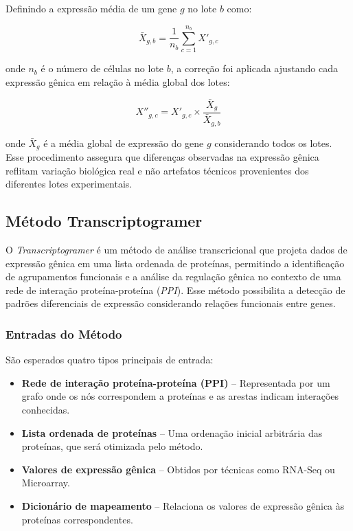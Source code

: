 \documentclass[12pt]{article}
\begin{document}
Definindo a expressão média de um gene $g$ no lote $b$ como:

\begin{equation}
    \bar{X}_{g,b} = \frac{1}{n_b} \sum_{c=1}^{n_b} X'_{g,c}
\end{equation}

onde $n_b$ é o número de células no lote $b$, a correção foi aplicada ajustando cada expressão gênica em relação à média global dos lotes:

\begin{equation}
    X''_{g,c} = X'_{g,c} \times \frac{\bar{X}_g}{\bar{X}_{g,b}}
\end{equation}

onde $\bar{X}_g$ é a média global de expressão do gene $g$ considerando todos os lotes. Esse procedimento assegura que diferenças observadas na expressão gênica reflitam variação biológica real e não artefatos técnicos provenientes dos diferentes lotes experimentais.



\subsection{Método Transcriptogramer\cite{morais}}

O \textit{Transcriptogramer} é um método de análise transcricional que projeta dados de expressão gênica em uma lista ordenada de proteínas, permitindo a identificação de agrupamentos funcionais e a análise da regulação gênica no contexto de uma rede de interação proteína-proteína (\textit{PPI}). Esse método possibilita a detecção de padrões diferenciais de expressão considerando relações funcionais entre genes.

\subsubsection{Entradas do Método}

São esperados quatro tipos principais de entrada:
\begin{itemize}
    \item \textbf{Rede de interação proteína-proteína (PPI)} – Representada por um grafo onde os nós correspondem a proteínas e as arestas indicam interações conhecidas.
    \item \textbf{Lista ordenada de proteínas} – Uma ordenação inicial arbitrária das proteínas, que será otimizada pelo método.
    \item \textbf{Valores de expressão gênica} – Obtidos por técnicas como RNA-Seq ou Microarray.
    \item \textbf{Dicionário de mapeamento} – Relaciona os valores de expressão gênica às proteínas correspondentes.
\end{itemize}
\end{document}
